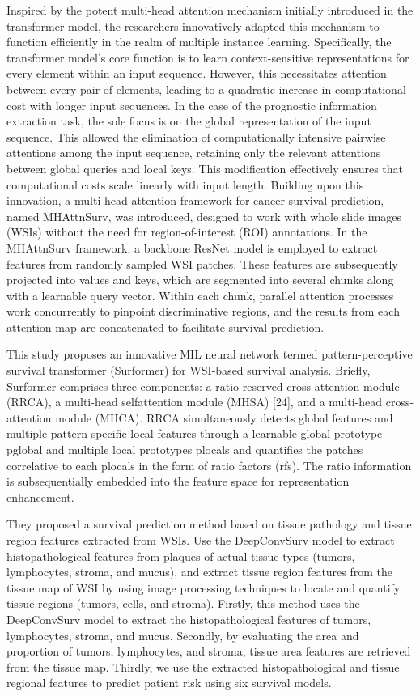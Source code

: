 \documentclass[journal,twoside,web]{ieeecolor}
\begin{document}
Inspired by the potent multi-head attention mechanism initially introduced in the transformer\cite{jiang2023mhattnsurv} model, the researchers innovatively adapted this mechanism to function efficiently in the realm of multiple instance learning. Specifically, the transformer model's core function is to learn context-sensitive representations for every element within an input sequence. However, this necessitates attention between every pair of elements, leading to a quadratic increase in computational cost with longer input sequences. In the case of the prognostic information extraction task, the sole focus is on the global representation of the input sequence. This allowed the elimination of computationally intensive pairwise attentions among the input sequence, retaining only the relevant attentions between global queries and local keys. This modification effectively ensures that computational costs scale linearly with input length. Building upon this innovation, a multi-head attention framework for cancer survival prediction, named MHAttnSurv, was introduced, designed to work with whole slide images (WSIs) without the need for region-of-interest (ROI) annotations. In the MHAttnSurv framework, a backbone ResNet model is employed to extract features from randomly sampled WSI patches. These features are subsequently projected into values and keys, which are segmented into several chunks along with a learnable query vector. Within each chunk, parallel attention processes work concurrently to pinpoint discriminative regions, and the results from each attention map are concatenated to facilitate survival prediction.

This study proposes an innovative MIL neural network termed pattern-perceptive survival transformer (Surformer) for WSI-based survival analysis. Briefly, Surformer comprises three components: a ratio-reserved cross-attention module (RRCA), a multi-head selfattention module (MHSA) [24], and a multi-head cross-attention module (MHCA). RRCA simultaneously detects global features and multiple pattern-specific local features through a learnable global prototype pglobal and multiple local prototypes plocals and quantifies the patches correlative to each plocals in the form of ratio factors (rfs). The ratio information is subsequentially embedded into the feature space for representation enhancement. 

They proposed a survival prediction method \cite{li2023novel} based on tissue pathology and tissue region features extracted from WSIs. Use the DeepConvSurv model to extract histopathological features from plaques of actual tissue types (tumors, lymphocytes, stroma, and mucus), and extract tissue region features from the tissue map of WSI by using image processing techniques to locate and quantify tissue regions (tumors, cells, and stroma). Firstly, this method uses the DeepConvSurv model to extract the histopathological features of tumors, lymphocytes, stroma, and mucus. Secondly, by evaluating the area and proportion of tumors, lymphocytes, and stroma, tissue area features are retrieved from the tissue map. Thirdly, we use the extracted histopathological and tissue regional features to predict patient risk using six survival models.
\end{document}

